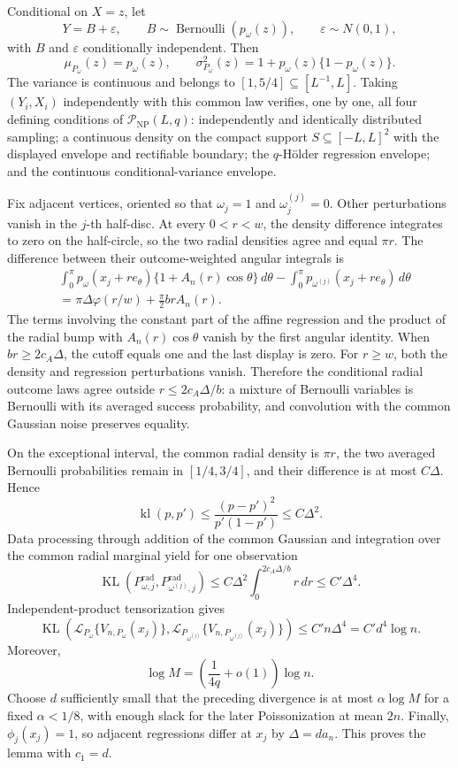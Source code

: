 Conditional on \(X=z\), let
\[
 Y=B+\varepsilon,
 \qquad B\sim\operatorname{Bernoulli}(p_\omega(z)),
 \qquad \varepsilon\sim N(0,1),
\]
with \(B\) and \(\varepsilon\) conditionally independent.  Then
\[
 \mu_{P_\omega}(z)=p_\omega(z),
 \qquad
 \sigma^2_{P_\omega}(z)=1+p_\omega(z)\{1-p_\omega(z)\}.
\]
The variance is continuous and belongs to \([1,5/4]\subseteq[L^{-1},L]\).  Taking \((Y_i,X_i)\) independently with this common law verifies, one by one, all four defining conditions of \(\mathcal P_{\mathrm{NP}}(L,q)\): independently and identically distributed sampling; a continuous density on the compact support \(S\subseteq[-L,L]^2\) with the displayed envelope and rectifiable boundary; the \(q\)-H\"older regression envelope; and the continuous conditional-variance envelope.

Fix adjacent vertices, oriented so that \(\omega_j=1\) and \(\omega_j^{(j)}=0\).  Other perturbations vanish in the \(j\)-th half-disc.  At every \(0<r<w\), the density difference integrates to zero on the half-circle, so the two radial densities agree and equal \(\pi r\).  The difference between their outcome-weighted angular integrals is
\[
\begin{aligned}
 &\int_0^\pi p_\omega(x_j+re_\theta)
       \{1+A_n(r)\cos\theta\}\,d\theta
 -\int_0^\pi p_{\omega^{(j)}}(x_j+re_\theta)\,d\theta\\
 &=\pi\Delta\varphi(r/w)+\frac\pi2brA_n(r).
\end{aligned}
\]
The terms involving the constant part of the affine regression and the product of the radial bump with \(A_n(r)\cos\theta\) vanish by the first angular identity.  When \(br\geq2c_A\Delta\), the cutoff equals one and the last display is zero.  For \(r\geq w\), both the density and regression perturbations vanish.  Therefore the conditional radial outcome laws agree outside \(r\leq2c_A\Delta/b\): a mixture of Bernoulli variables is Bernoulli with its averaged success probability, and convolution with the common Gaussian noise preserves equality.

On the exceptional interval, the common radial density is \(\pi r\), the two averaged Bernoulli probabilities remain in \([1/4,3/4]\), and their difference is at most \(C\Delta\).  Hence
\[
 \operatorname{kl}(p,p')\leq\frac{(p-p')^2}{p'(1-p')}
 \leq C\Delta^2.
\]
Data processing through addition of the common Gaussian and integration over the common radial marginal yield for one observation
\[
 \operatorname{KL}(P^{\mathrm{rad}}_{\omega,j},P^{\mathrm{rad}}_{\omega^{(j)},j})
 \leq C\Delta^2\int_0^{2c_A\Delta/b}r\,dr
 \leq C'\Delta^4.
\]
Independent-product tensorization gives
\[
 \operatorname{KL}\!\left(\mathcal L_{P_\omega}\{V_{n,P_\omega}(x_j)\},
 \mathcal L_{P_{\omega^{(j)}}}\{V_{n,P_{\omega^{(j)}}}(x_j)\}\right)
 \leq C'n\Delta^4=C'd^4\log n.
\]
Moreover,
\[
 \log M=\left(\frac1{4q}+o(1)\right)\log n.
\]
Choose \(d\) sufficiently small that the preceding divergence is at most \(\alpha\log M\) for a fixed \(\alpha<1/8\), with enough slack for the later Poissonization at mean \(2n\).  Finally, \(\phi_j(x_j)=1\), so adjacent regressions differ at \(x_j\) by \(\Delta=da_n\).  This proves the lemma with \(c_1=d\).